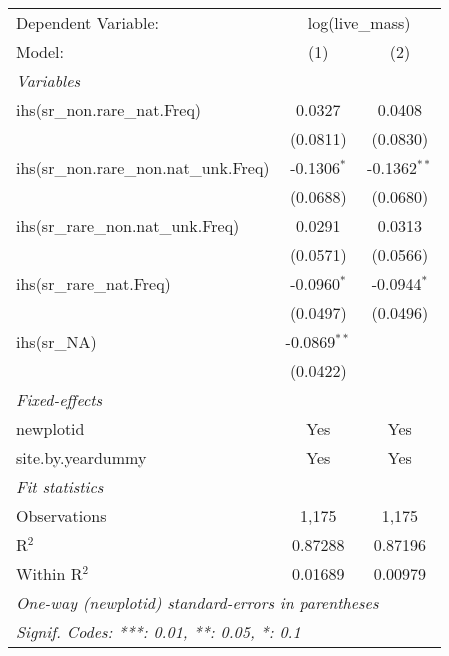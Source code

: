 \begin{tabular}{lcc}
\tabularnewline\midrule\midrule
Dependent Variable:&\multicolumn{2}{c}{log(live\_mass)}\\
Model:&(1) & (2)\\
\midrule \emph{Variables}&   &  \\
ihs(sr\_non.rare\_nat.Freq)&0.0327 & 0.0408\\
  &(0.0811) & (0.0830)\\
ihs(sr\_non.rare\_non.nat\_unk.Freq)&-0.1306$^{*}$ & -0.1362$^{**}$\\
  &(0.0688) & (0.0680)\\
ihs(sr\_rare\_non.nat\_unk.Freq)&0.0291 & 0.0313\\
  &(0.0571) & (0.0566)\\
ihs(sr\_rare\_nat.Freq)&-0.0960$^{*}$ & -0.0944$^{*}$\\
  &(0.0497) & (0.0496)\\
ihs(sr\_NA)&-0.0869$^{**}$ &   \\
  &(0.0422) &   \\
\midrule \emph{Fixed-effects}&   &  \\
newplotid & Yes & Yes\\
site.by.yeardummy & Yes & Yes\\
\midrule \emph{Fit statistics}&  & \\
Observations & 1,175&1,175\\
R$^2$ & 0.87288&0.87196\\
Within R$^2$ & 0.01689&0.00979\\
\midrule\midrule\multicolumn{3}{l}{\emph{One-way (newplotid) standard-errors in parentheses}}\\
\multicolumn{3}{l}{\emph{Signif. Codes: ***: 0.01, **: 0.05, *: 0.1}}\\
\end{tabular}


